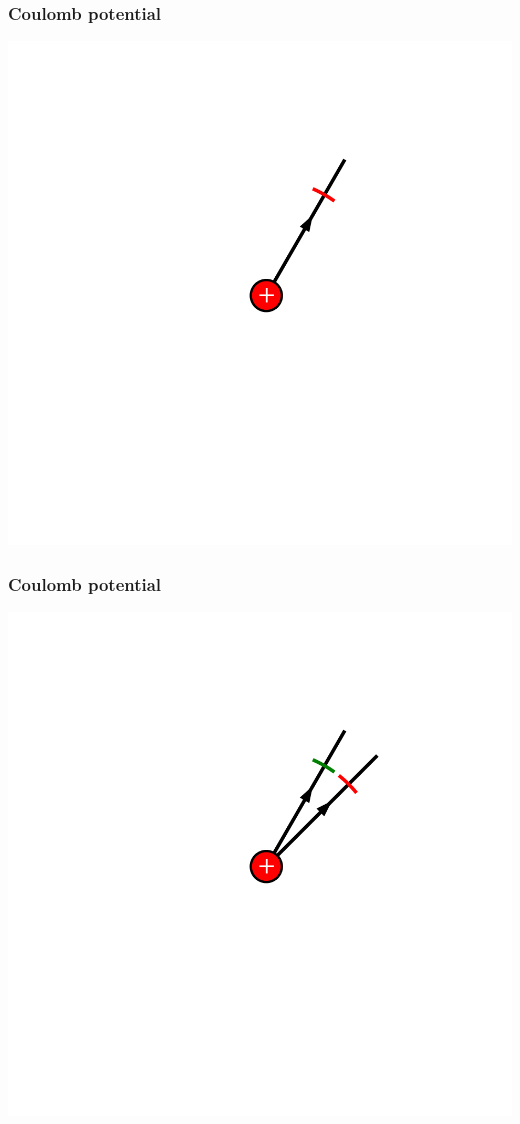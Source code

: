 \documentclass{beamer}
\begin{document}
\begin{frame}
\frametitle{Coulomb potential}
\begin{center}
	\includegraphics[width=0.75\columnwidth]{figs/seq/frame1}
\end{center}
\end{frame}
\begin{frame}
\frametitle{Coulomb potential}
\begin{center}
	\includegraphics[width=0.75\columnwidth]{figs/seq/frame2}
\end{center}
\end{frame}
\end{document}
